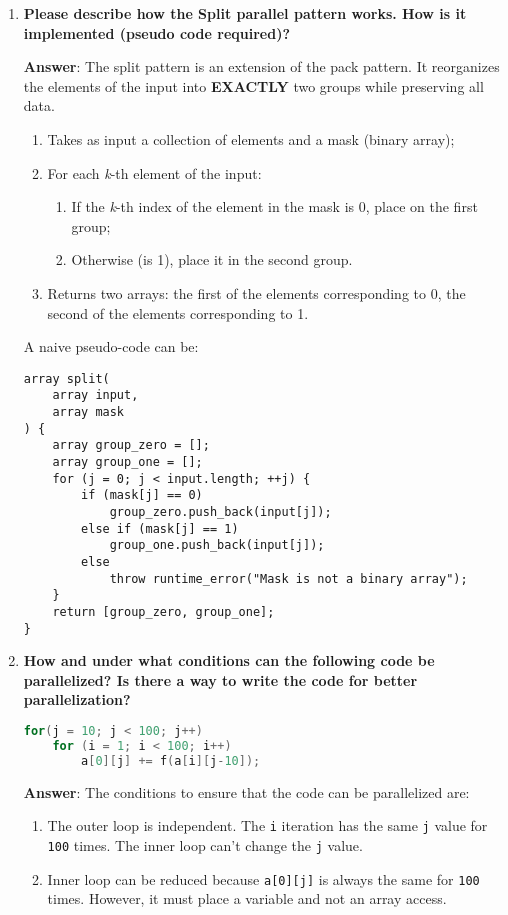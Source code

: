 \begin{enumerate}[label=\Alph*.]
    \item \textcolor{Green3}{\textbf{%
        Please describe how the Split parallel pattern works. How is it implemented (pseudo code required)? 
    }}

    \textbf{Answer}: The split pattern is an extension of the pack pattern. It reorganizes the elements of the input into \textbf{EXACTLY} two groups while preserving all data.
    \begin{enumerate}
        \item Takes as input a collection of elements and a mask (binary array);
        \item For each \emph{k}-th element of the input:
        \begin{enumerate}
            \item If the \emph{k}-th index of the element in the mask is 0, place on the first group;
            \item Otherwise (is 1), place it in the second group.
        \end{enumerate}
        \item Returns two arrays: the first of the elements corresponding to 0, the second of the elements corresponding to 1.
    \end{enumerate}

    A naive pseudo-code can be:
    \begin{lstlisting}
array split(
    array input,
    array mask
) {
    array group_zero = [];
    array group_one = [];
    for (j = 0; j < input.length; ++j) {
        if (mask[j] == 0)
            group_zero.push_back(input[j]);
        else if (mask[j] == 1)
            group_one.push_back(input[j]);
        else
            throw runtime_error("Mask is not a binary array");
    }
    return [group_zero, group_one];
}\end{lstlisting}

    \item \textcolor{Green3}{\textbf{%
        How and under what conditions can the following code be parallelized? Is there a way to write the code for better parallelization?
    }}
    \begin{lstlisting}[language=c++]
for(j = 10; j < 100; j++)
    for (i = 1; i < 100; i++)
        a[0][j] += f(a[i][j-10]);\end{lstlisting}

    \textbf{Answer}: The conditions to ensure that the code can be parallelized are:
    \begin{enumerate}
        \item The outer loop is independent. The \texttt{i} iteration has the same \texttt{j} value for \texttt{100} times. The inner loop can't change the \texttt{j} value.
        \item Inner loop can be reduced because \texttt{a[0][j]} is always the same for \texttt{100} times. However, it must place a variable and not an array access.
    \end{enumerate}
    

\end{enumerate}
